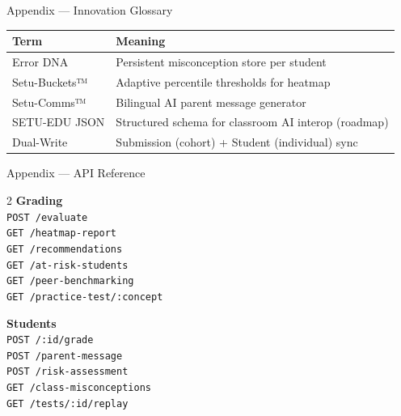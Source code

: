 \documentclass[aspectratio=169,10pt]{beamer}
\begin{document}
\begin{frame}{Appendix — Innovation Glossary}
  \footnotesize
  \begin{tabular}{@{}lp{8.5cm}@{}}
    \toprule
    \textbf{Term} & \textbf{Meaning} \\
    \midrule
    Error DNA & Persistent misconception store per student \\
    Setu-Buckets™ & Adaptive percentile thresholds for heatmap \\
    Setu-Comms™ & Bilingual AI parent message generator \\
    SETU-EDU JSON & Structured schema for classroom AI interop (roadmap) \\
    Dual-Write & Submission (cohort) + Student (individual) sync \\
    \bottomrule
  \end{tabular}
\end{frame}

\begin{frame}{Appendix — API Reference}
  \tiny
  \begin{multicols}{2}
  \textbf{Grading}\\ \texttt{POST /evaluate}\\
  \texttt{GET /heatmap-report}\\
  \texttt{GET /recommendations}\\
  \texttt{GET /at-risk-students}\\
  \texttt{GET /peer-benchmarking}\\
  \texttt{GET /practice-test/:concept}

  \columnbreak
  \textbf{Students}\\ \texttt{POST /:id/grade}\\
  \texttt{POST /parent-message}\\
  \texttt{POST /risk-assessment}\\
  \texttt{GET /class-misconceptions}\\
  \texttt{GET /tests/:id/replay}
  \end{multicols}
\end{frame}
\end{document}

